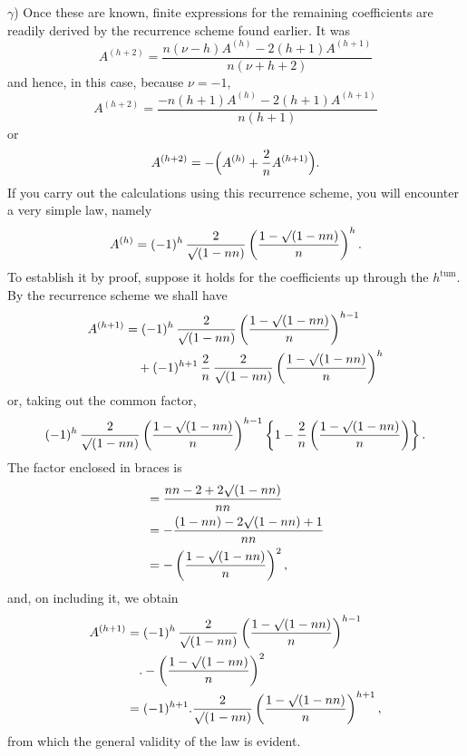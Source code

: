 $\gamma$) Once these are known, finite expressions for the remaining coefficients are readily derived by the recurrence scheme found earlier. It was
\[
A^{(h+2)} = \frac{n(\nu-h)A^{(h)} - 2(h+1)A^{(h+1)}}{n(\nu+h+2)}
\]
and hence, in this case, because $\nu=-1$,
\[
A^{(h+2)} = \frac{-n(h+1)A^{(h)} - 2(h+1)A^{(h+1)}}{n(h+1)}
\]
or
\[
A^{(h+2)} = -\Bigl(A^{(h)} + \frac{2}{n}A^{(h+1)}\Bigr).
\]
If you carry out the calculations using this recurrence scheme, you will encounter a very simple law, namely
\[
A^{(h)} = (-1)^h\,\frac{2}{\mathord{\surd}(1-nn)}\left(\frac{1-\mathord{\surd}(1-nn)}{n}\right)^{h}.
\]
To establish it by proof, suppose it holds for the coefficients up through the $h^{\text{tum}}$. By the recurrence scheme we shall have
\[
\begin{aligned}
A^{(h+1)} & = (-1)^h\,\frac{2}{\mathord{\surd}(1-nn)}\left(\frac{1-\mathord{\surd}(1-nn)}{n}\right)^{h-1}\\&\quad + (-1)^{h+1}\,\frac{2}{n}\,\frac{2}{\mathord{\surd}(1-nn)}\left(\frac{1-\mathord{\surd}(1-nn)}{n}\right)^{h}
\end{aligned}
\]
or, taking out the common factor,
\[
(-1)^h\,\frac{2}{\mathord{\surd}(1-nn)}\left(\frac{1-\mathord{\surd}(1-nn)}{n}\right)^{h-1}\left\{1-\frac{2}{n}\left(\frac{1-\mathord{\surd}(1-nn)}{n}\right)\right\}.
\]
The factor enclosed in braces is
\[
\begin{aligned}
&= \frac{nn-2+2\mathord{\surd}(1-nn)}{nn}\\&= -\frac{(1-nn)-2\mathord{\surd}(1-nn)+1}{nn}\\&= -\left(\frac{1-\mathord{\surd}(1-nn)}{n}\right)^{2},
\end{aligned}
\]
and, on including it, we obtain
\[
\begin{aligned}
A^{(h+1)} & = (-1)^h\,\frac{2}{\mathord{\surd}(1-nn)}\left(\frac{1-\mathord{\surd}(1-nn)}{n}\right)^{h-1}\\&\quad .  -\left(\frac{1-\mathord{\surd}(1-nn)}{n}\right)^{2}\\&= (-1)^{h+1} . \frac{2}{\mathord{\surd}(1-nn)}\left(\frac{1-\mathord{\surd}(1-nn)}{n}\right)^{h+1},
\end{aligned}
\]
from which the general validity of the law is evident.

